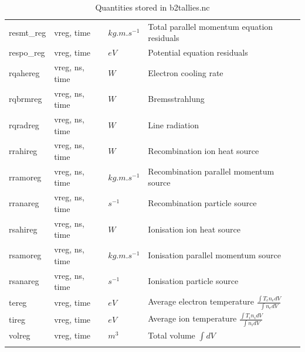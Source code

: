 \documentclass[a4paper,10pt]{report}
\begin{document}
\begin{center}
\begin{longtable}{|l|l|l|l|}
resmt\_reg \index{resmt\_reg}\index{b2tallies.nc, resmt\_reg}                    & vreg, time     & $kg.m.s^{-1}$ & Total parallel momentum equation residuals \\
respo\_reg \index{respo\_reg}\index{b2tallies.nc, respo\_reg}                    & vreg, time     & $eV$          & Potential equation residuals \\
rqahereg \index{rqahereg}\index{b2tallies.nc, rqahereg}                          & vreg, ns, time & $W$           & Electron cooling rate \\
rqbrmreg \index{rqbrmreg}\index{b2tallies.nc, rqbrmreg}                          & vreg, ns, time & $W$           & Bremsstrahlung \\
rqradreg \index{rqradreg}\index{b2tallies.nc, rqradreg}                          & vreg, ns, time & $W$           & Line radiation \\
rrahireg \index{rrahireg}\index{b2tallies.nc, rrahireg}                          & vreg, ns, time & $W$           & Recombination ion heat source \\
rramoreg \index{rramoreg}\index{b2tallies.nc, rramoreg}                          & vreg, ns, time & $kg.m.s^{-1}$ & Recombination parallel momentum source \\
rranareg \index{rranareg}\index{b2tallies.nc, rranareg}                          & vreg, ns, time & $s^{-1}$      & Recombination particle source \\
rsahireg \index{rsahireg}\index{b2tallies.nc, rsahireg}                          & vreg, ns, time & $W$           & Ionisation ion heat source \\
rsamoreg \index{rsamoreg}\index{b2tallies.nc, rsamoreg}                          & vreg, ns, time & $kg.m.s^{-1}$ & Ionisation parallel momentum source \\
rsanareg \index{rsanareg}\index{b2tallies.nc, rsanareg}                          & vreg, ns, time & $s^{-1}$      & Ionisation particle source \\
tereg \index{tereg}\index{b2tallies.nc, tereg}                                   & vreg, time     & $eV$          & Average electron temperature $\frac{\int T_e n_e dV}{\int n_e dV}$ \\
tireg \index{tireg}\index{b2tallies.nc, tireg}                                   & vreg, time     & $eV$          & Average ion temperature $\frac{\int T_i n_i dV}{\int n_i dV}$ \\
volreg \index{volreg}\index{b2tallies.nc, volreg}                                & vreg, time     & $m^3$         & Total volume $\int dV$\\
    \hline
    \caption{Quantities stored in b2tallies.nc}
    \label{tab:b2tallies}
  \end{longtable}
\end{center}
\end{document}
